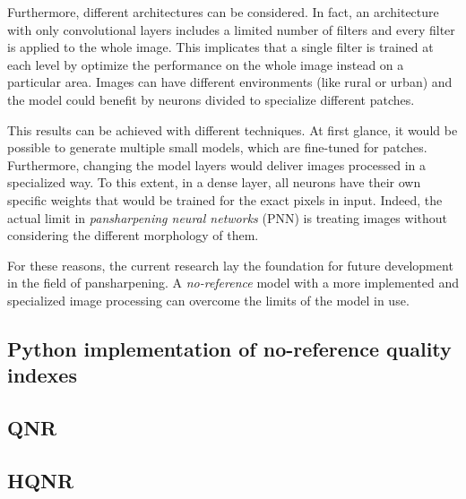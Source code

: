 \documentclass[12pt]{report}
\begin{document}
Furthermore, different architectures can be considered.
In fact, an architecture with only convolutional layers includes a limited number of filters and every filter is applied to the whole image.
This implicates that a single filter is trained at each level by optimize the performance on the whole image instead on a particular area.
Images can have different environments (like rural or urban) and the model could benefit by neurons divided to specialize different patches.

This results can be achieved with different techniques.
At first glance, it would be possible to generate multiple small models, which are fine-tuned for patches.
Furthermore, changing the model layers would deliver images processed in a specialized way.
To this extent, in a dense layer, all neurons have their own specific weights that would be trained for the exact pixels in input.
Indeed, the actual limit in \textit{pansharpening neural networks} (PNN) is treating images without considering the different morphology of them.

For these reasons, the current research lay the foundation for future development in the field of pansharpening.
A \textit{no-reference} model with a more implemented and specialized image processing can overcome the limits of the model in use.
\newpage




\newpage



\appendix

\begin{spacing}{1}
    \chapter{Python implementation of no-reference quality indexes }
        \section{QNR}
        \label{qnr_functions}
        

        \section{HQNR}
        \label{hqnr_functions}
        
\end{spacing}

\restoregeometry
\end{document}
